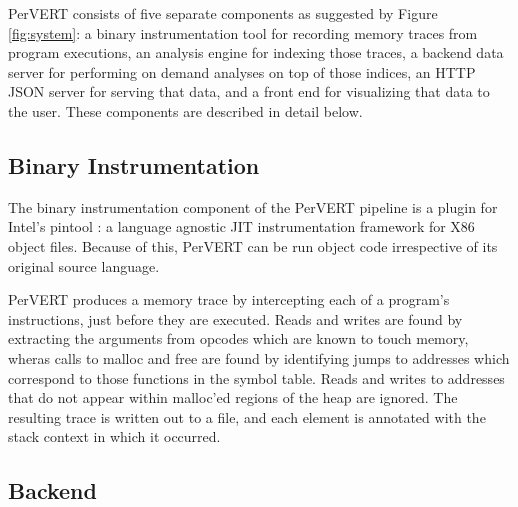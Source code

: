 \documentclass[annual]{acmsiggraph}
\begin{document}
  PerVERT consists of five separate components as suggested by Figure \ref{fig:system}:
    a binary instrumentation tool for recording memory traces from program executions,
    an analysis engine for indexing those traces,
    a backend data server for performing on demand analyses on top of those indices,
    an HTTP JSON server for serving that data,
    and a front end for visualizing that data to the user.
  These components are described in detail below.  

  \subsection{Binary Instrumentation}

    The binary instrumentation component of the PerVERT pipeline is a plugin for Intel's pintool \cite{Luk:2005:PBC:1065010.1065034}:
      a language agnostic JIT instrumentation framework for X86 object files.
    Because of this, PerVERT can be run object code irrespective of its original source language.

    PerVERT produces a memory trace by intercepting each of a program's instructions, just before they are executed.
    Reads and writes are found by extracting the arguments from opcodes which are known to touch memory,
      wheras calls to malloc and free are found by identifying jumps to addresses which correspond to those functions
      in the symbol table.
    Reads and writes to addresses that do not appear within malloc'ed regions of the heap are ignored.  
    The resulting trace is written out to a file, and each element is annotated with the stack context in which it occurred.  

  \subsection{Backend}
\end{document}
